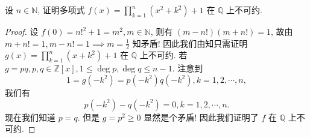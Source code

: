 \documentclass[../../main.tex]{subfiles}%
\begin{document}
\begin{example}
设 \( n \in \mathbb{N} \), 证明多项式 \( f(x) = \prod_{k=1}^n (x^2 + k^2) + 1 \) 在 \( \mathbb{Q} \) 上不可约.
\end{example}
\begin{proof}

设 \( f(0) = n!^2 + 1 = m^2, m \in \mathbb{N} \), 则有 \( (m - n!)(m + n!) = 1 \), 故由 \( m + n! = 1, m - n! = 1 \implies m = \frac{1}{2} \) 知矛盾! 因此我们由知只需证明 \( g(x) = \prod_{k=1}^n (x + k^2) + 1 \) 在 \( \mathbb{Q} \) 上不可约. 若 \( g = pq, p,q \in \mathbb{Z}[x], 1 \leqslant \deg p, \deg q \leqslant n - 1 \). 注意到
\[
1 = g(-k^2) = p(-k^2)q(-k^2), k = 1,2,\cdots,n,
\]
我们有
\[
p(-k^2) - q(-k^2) = 0, k = 1,2,\cdots,n.
\]
现在我们知道 \( p = q \). 但是 \( g = p^2 \geqslant 0 \) 显然是个矛盾! 因此我们证明了 \( f \) 在 \( \mathbb{Q} \) 上不可约.

\end{proof}
\end{document}

